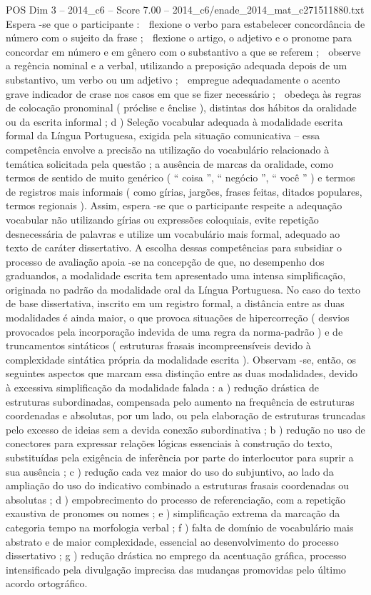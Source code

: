 \begin{textsample}{POS Dim 3 – 2014\_c6 – Score 7.00 – 2014\_c6/enade\_2014\_mat\_c271511880.txt}
Espera -se que o participante :  flexione o verbo para estabelecer concordância de número com o sujeito da frase ;  flexione o artigo, o adjetivo e o pronome para concordar em número e em gênero com o substantivo a que se referem ;  observe a regência nominal e a verbal, utilizando a preposição adequada depois de um substantivo, um verbo ou um adjetivo ;  empregue adequadamente o acento grave indicador de crase nos casos em que se fizer necessário ;  obedeça às regras de colocação pronominal ( próclise e ênclise ), distintas dos hábitos da oralidade ou da escrita informal ; d ) Seleção vocabular adequada à modalidade escrita formal da Língua Portuguesa, exigida pela situação comunicativa – essa competência envolve a precisão na utilização do vocabulário relacionado à temática solicitada pela questão ; a ausência de marcas da oralidade, como termos de sentido de muito genérico ( “ coisa ”, “ negócio ”, “ você ” ) e termos de registros mais informais ( como gírias, jargões, frases feitas, ditados populares, termos regionais ).
Assim, espera -se que o participante respeite a adequação vocabular não utilizando gírias ou expressões coloquiais, evite repetição desnecessária de palavras e utilize um vocabulário mais formal, adequado ao texto de caráter dissertativo.
A escolha dessas competências para subsidiar o processo de avaliação apoia -se na concepção de que, no desempenho dos graduandos, a modalidade escrita tem apresentado uma intensa simplificação, originada no padrão da modalidade oral da Língua Portuguesa.
No caso do texto de base dissertativa, inscrito em um registro formal, a distância entre as duas modalidades é ainda maior, o que provoca situações de hipercorreção ( desvios provocados pela incorporação indevida de uma regra da norma-padrão ) e de truncamentos sintáticos ( estruturas frasais incompreensíveis devido à complexidade sintática própria da modalidade escrita ).
Observam -se, então, os seguintes aspectos que marcam essa distinção entre as duas modalidades, devido à excessiva simplificação da modalidade falada : a ) redução drástica de estruturas subordinadas, compensada pelo aumento na frequência de estruturas coordenadas e absolutas, por um lado, ou pela elaboração de estruturas truncadas pelo excesso de ideias sem a devida conexão subordinativa ; b ) redução no uso de conectores para expressar relações lógicas essenciais à construção do texto, substituídas pela exigência de inferência por parte do interlocutor para suprir a sua ausência ; c ) redução cada vez maior do uso do subjuntivo, ao lado da ampliação do uso do indicativo combinado a estruturas frasais coordenadas ou absolutas ; d ) empobrecimento do processo de referenciação, com a repetição exaustiva de pronomes ou nomes ; e ) simplificação extrema da marcação da categoria tempo na morfologia verbal ; f ) falta de domínio de vocabulário mais abstrato e de maior complexidade, essencial ao desenvolvimento do processo dissertativo ; g ) redução drástica no emprego da acentuação gráfica, processo intensificado pela divulgação imprecisa das mudanças promovidas pelo último acordo ortográfico.

\end{textsample}
